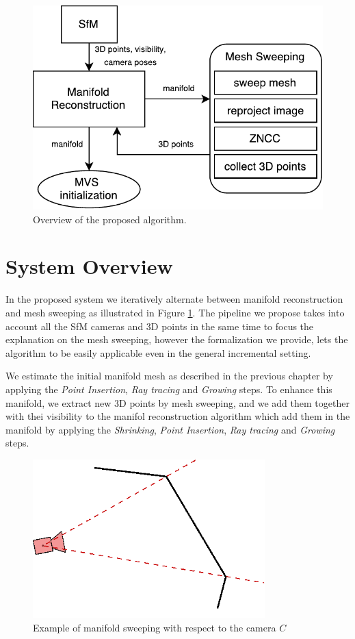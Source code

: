 \begin{figure}[t]
  \centering
  \includegraphics[width=0.9\columnwidth]{./img/ch-sweep/mesh-sweeping_overview}
\caption{Overview of the proposed algorithm.}
  \label{fig:overview}
\end{figure}


\section{System Overview}
\label{sec:overview_sweep}
In the proposed system we iteratively alternate between manifold reconstruction and mesh sweeping as illustrated in Figure \ref{fig:overview}.
The pipeline we propose takes into account all the SfM cameras and 3D points in the same time to focus the explanation on the mesh sweeping, however the formalization we provide, lets the algorithm to be easily applicable even in the general incremental setting.

We estimate the initial manifold mesh as described in the previous chapter by applying the   \emph{Point Insertion}, \emph{Ray tracing} and \emph{Growing} steps.
To enhance this manifold, we extract new 3D points by mesh sweeping, and we add them together with thei visibility to the manifol reconstruction algorithm which add them in the manifold by applying the \emph{Shrinking}, \emph{Point Insertion}, \emph{Ray tracing} and \emph{Growing} steps.


\begin{figure}[tp]
  \centering
  \includegraphics[width=0.8\textwidth]{././img/sweep.pdf}
  \caption{Example of manifold sweeping with respect to the camera $C$}
  \label{fig:sweep}
\end{figure}


